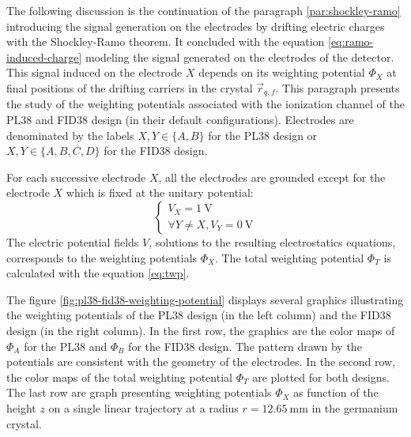 The following discussion is the continuation of the paragraph \ref{par:shockley-ramo} introducing the signal generation on the electrodes by drifting electric charges with the Shockley-Ramo theorem. It concluded with the equation \ref{eq:ramo-induced-charge} modeling the signal generated on the electrodes of the detector. This signal induced on the electrode $X$ depends on its weighting potential $\Phi_X$ at final positions of the drifting carriers in the crystal $\vec{r}_{q, f}$. This paragraph presents the study of the weighting potentials associated with the ionization channel of the PL38 and FID38 design (in their default configurations). Electrodes are denominated by the labels $X,Y \in \{ A, B \}$ for the PL38 design or $X,Y \in \{ A, B, C, D \}$ for the FID38 design.

For each successive electrode $X$, all the electrodes are grounded except for the electrode $X$ which is fixed at the unitary potential:
\begin{equation}
\begin{cases}
V_X = \SI{1}{\volt} \\
\forall Y \neq X, V_Y = \SI{0}{\volt}
\end{cases}
\end{equation}
The electric potential fields $V$, solutions to the resulting electrostatics equations, corresponds to the weighting potentials $\Phi_X$. The total weighting potential $\Phi_T$ is calculated with the equation \ref{eq:twp}.
 
The figure \ref{fig:pl38-fid38-weighting-potential} displays several graphics illustrating the weighting potentials of the PL38 design (in the left column) and the FID38 design (in the right column).
In the first row, the graphics are the color maps of $\Phi_A$ for the PL38 and $\Phi_B$ for the FID38 design. The pattern drawn by the potentials are consistent with the geometry of the electrodes. 
 In the second row, the color maps of the total weighting potential $\Phi_T$ are plotted for both designs. The last row are graph presenting weighting potentials $\Phi_X$ as function of the height $z$ on a single linear trajectory at a radius $r=\SI{12.65}{\mm}$ in the germanium crystal.


